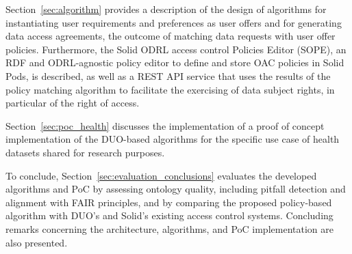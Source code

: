 Section~\ref{sec:algorithm} provides a description of the design of algorithms for instantiating user requirements and preferences as user offers and for generating data access agreements, the outcome of matching data requests with user offer policies.
Furthermore, the Solid ODRL access control Policies Editor (SOPE), an RDF and ODRL-agnostic policy editor to define and store OAC policies in Solid Pods, is described, as well as a REST API service that uses the results of the policy matching algorithm to facilitate the exercising of data subject rights, in particular of the right of access.

Section~\ref{sec:poc_health} discusses the implementation of a proof of concept implementation of the DUO-based algorithms for the specific use case of health datasets shared for research purposes.

To conclude, Section~\ref{sec:evaluation_conclusions} evaluates the developed algorithms and PoC by assessing ontology quality, including pitfall detection and alignment with FAIR principles, and by comparing the proposed policy-based algorithm with DUO's and Solid's existing access control systems.
Concluding remarks concerning the architecture, algorithms, and PoC implementation are also presented.




